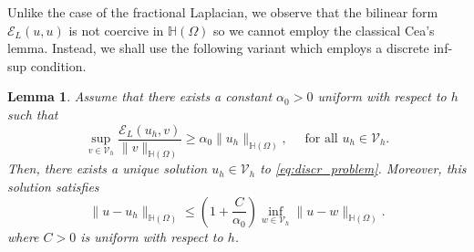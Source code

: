 \documentclass[10 pt]{article}
\newtheorem{lemma}[theorem]{Lemma}
\numberwithin{equation}{section}
\def\cE{\mathcal{E}}
\begin{document}
Unlike the case of the fractional Laplacian, we observe that the bilinear form $\cE_{L}(u,u)$ is not coercive in $\mathbb H(\Omega)$ so we cannot employ the classical Cea's lemma. Instead, we shall use the following variant which employs a discrete inf-sup condition. 
%
\begin{lemma}\label{lem:cea_mg}
Assume that there exists a constant $\alpha_0>0$ uniform with respect to $h$ such that
%
\begin{equation}\label{eq:discr_inf_sup}
    \sup_{v\in \mathcal V_h}\frac{\cE_{L}(u_h,v)}{\|v\|_{\mathbb H(\Omega)}}\geq \alpha_0\|u_h\|_{\mathbb H(\Omega)}, \quad\text{ for all } u_h\in\mathcal V_h.
\end{equation}
%
Then, there exists a unique solution $u_h\in \mathcal V_h$ to \eqref{eq:discr_problem}. Moreover, this solution satisfies
%
\begin{equation}\label{eq:stability_cea}
    \|u-u_h\|_{\mathbb H(\Omega)}\leq \left(1+\frac{C}{\alpha_0}\right)\inf_{w\in\mathcal V_h}\|u-w\|_{\mathbb H(\Omega)}.
\end{equation}
%
where $C>0$ is uniform with respect to $h$.
\end{lemma}
%
\end{document}
